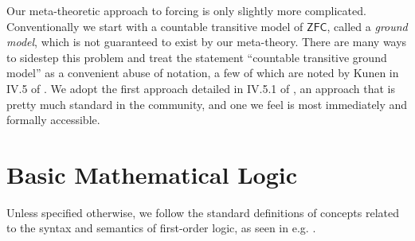 \documentclass[12pt, twoside]{memoir}
\numberwithin{equation}{section}
\theoremstyle{definition}
\theoremstyle{remark}
\theoremstyle{definition}
\theoremstyle{definition}
\theoremstyle{definition}
\theoremstyle{remark}
\begin{document}
Our meta-theoretic approach to forcing is only slightly more complicated. Conventionally we start with a countable transitive model of $\mathsf{ZFC}$, called a \emph{ground model}, which is not guaranteed to exist by our meta-theory. There are many ways to sidestep this problem and treat the statement ``countable transitive ground model'' as a convenient abuse of notation, a few of which are noted by Kunen in IV.5 of \cite{kunen}. We adopt the first approach detailed in IV.5.1 of \cite{kunen}, an approach that is pretty much standard in the community, and one we feel is most immediately and formally accessible.

\section{Basic Mathematical Logic}

Unless specified otherwise, we follow the standard definitions of concepts related to the syntax and semantics of first-order logic, as seen in e.g. \cite{enderton}.
\end{document}
